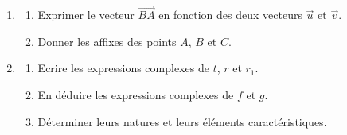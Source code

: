 \begin{description}
                  \begin{enumerate}
                        \item \begin{enumerate}
                                    \item Exprimer le vecteur $\overrightarrow{BA}$ 
                                          en fonction des deux vecteurs $\vec{u}$ et $\vec{v}$.
                                    \item Donner les affixes des points $A$, $B$ et $C$.
                              \end{enumerate}
                        \item \begin{enumerate}
                                    \item Ecrire les expressions complexes de $t$, $r$ et $r_1$.
                                    \item En d\'eduire les expressions complexes de $f$ et $g$.
                                    \item D\'eterminer leurs natures et leurs \'el\'ements caract\'eristiques.
                              \end{enumerate}
                  \end{enumerate}
      \end{description}

